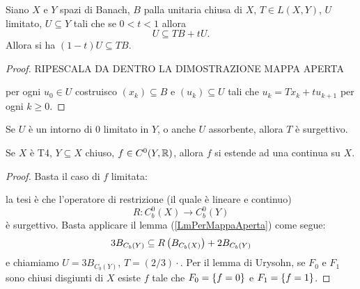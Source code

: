 \begin{lemma}\label{LmPerMappaAperta}
Siano $X$ e $Y$ spazi di Banach, $B$ palla unitaria chiusa di $X$, $T\in L(X,Y)$, $U$ limitato, $U\subseteq Y$ tali che se $0<t<1$ allora
\[U\subseteq TB+tU.\]
Allora si ha $(1-t)U\subseteq TB$.
\end{lemma}
\begin{proof}
RIPESCALA DA DENTRO LA DIMOSTRAZIONE MAPPA APERTA

per ogni $u_0\in U$ costruisco $(x_k)\subseteq B$ e $(u_k)\subseteq U$ tali che $u_k=Tx_k+t u_{k+1}$ per ogni $k\geq 0$.
\end{proof}

\begin{remark}
Se $U$ \`e un intorno di $0$ limitato in $Y$, o anche $U$ assorbente, allora $T$ \`e surgettivo.
\end{remark}


\begin{exercise}\label{ExThEstensioneTietze}
Se $X$ \`e T4, $Y\subseteq X$ chiuso, $f\in C^0(Y,\mathbb{R})$, allora $f$ si estende ad una continua su $X$.
\end{exercise}
\begin{proof}
Basta il caso di $f$ limitata:

la tesi \`e che l'operatore di restrizione (il quale \`e lineare e continuo)
\[R:C_b^0(X)\to C_b^0(Y)\]
\`e surgettivo. Basta applicare il lemma (\ref{LmPerMappaAperta}) come segue:
\[3B_{C_b(Y)}\subseteq R\left({B_{C_b(X)}}\right)+2B_{C_b(Y)}\]
e chiamiamo $U=3B_{C_b(Y)}$, $T=(2/3)\cdot$. Per il lemma di Urysohn, se $F_0$ e $F_1$ sono chiusi disgiunti di $X$ esiste $f$ tale che $F_0=\left\{{f=0}\right\}$ e $F_1=\left\{{f=1}\right\}$.
\end{proof}

